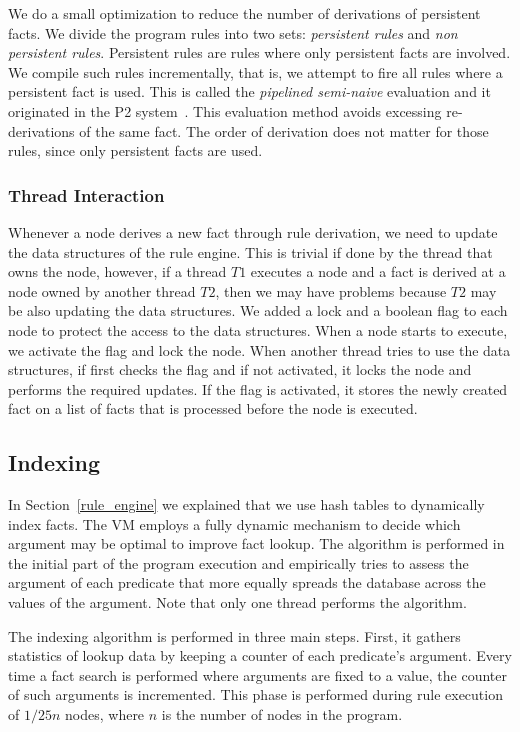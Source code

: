 We do a small optimization to reduce the number of derivations of persistent facts. We
divide the program rules into two sets: \emph{persistent rules} and \emph{non persistent rules}.
Persistent rules are rules where only persistent facts are involved. We compile such rules
incrementally, that is, we attempt to fire all rules where a persistent fact is used. This is called
the \emph{pipelined semi-naive} evaluation and it originated in the P2 system~\cite{Loo-condie-garofalakis-p2}.
This evaluation method avoids excessing re-derivations of the same fact. The order of derivation does not matter for those rules, since
only persistent facts are used.

\subsubsection{Thread Interaction}

Whenever a node derives a new fact through rule derivation, we need to update the data structures of the rule engine.
This is trivial if done by the thread that owns the node, however, if a thread $T1$ executes a node and a fact is derived
at a node owned by another thread $T2$, then we may have problems because $T2$ may be also updating the data structures.
We added a lock and a boolean flag to each node to protect the access to the data structures. When a node starts to execute,
we activate the flag and lock the node. When another thread tries to use the data structures, if first checks the flag and if
not activated, it locks the node and performs the required updates. If the flag is activated, it stores the newly created fact
on a list of facts that is processed before the node is executed.

\subsection{Indexing}\label{indexing}

In Section~\ref{rule_engine} we explained that we use hash tables to dynamically index facts.
The VM employs a fully dynamic mechanism to decide which argument may be optimal to improve fact lookup.
The algorithm is performed in the initial part of the program execution and empirically tries to assess the argument
of each predicate that more equally spreads the database across the values of the argument. Note that only one thread
performs the algorithm.

The indexing algorithm is performed in three main steps. First, it gathers statistics of lookup data by keeping a counter
of each predicate's argument.
Every time a fact search is performed where arguments are fixed to a value, the counter of such arguments is incremented. This phase is performed during rule execution of $1/25n$ nodes, where $n$ is the number of nodes in the program.


